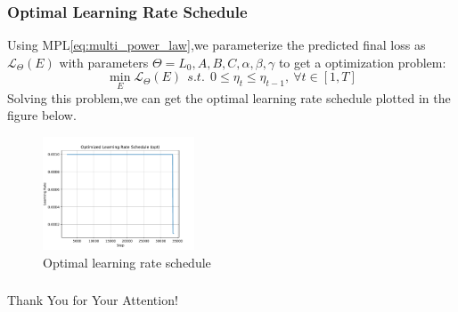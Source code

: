 \documentclass[aspectratio=169]{beamer}
\begin{document}
    \begin{frame}
        \frametitle{Optimal Learning Rate Schedule}
        Using MPL\eqref{eq:multi_power_law},we parameterize the predicted final loss as $\mathcal{L}_\Theta(E)$ with parameters $\Theta = {L_0,A,B,C,\alpha,\beta,\gamma}$ to get a optimization problem:
        $$
        \min_E \mathcal{L}_\Theta(E) \ \ s.t. \ \ 0\le\eta_t\le\eta_{t-1}, \ \forall t\in[1,T]
        $$
        Solving this problem,we can get the optimal learning rate schedule plotted in the figure below.
        \begin{figure}
            \centering
            \includegraphics[width=0.4\textwidth]{fig/opt/opt}
            \caption{Optimal learning rate schedule}\label{fig:optimal_lr_schedule}
        \end{figure}

    \end{frame}


    \begin{frame}
        \frametitle{}
        \begin{center}
            \Huge Thank You for Your Attention!
        \end{center}
    \end{frame}
\end{document}
